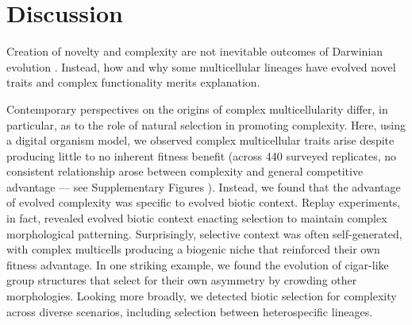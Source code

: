 \section{Discussion}
\label{sec:discussion}

Creation of novelty and complexity are not inevitable outcomes of Darwinian evolution \citep{stanley2017open}.
Instead, how and why some multicellular lineages have evolved novel traits and complex functionality merits explanation.

Contemporary perspectives on the origins of complex multicellularity differ, in particular, as to the role of natural selection in promoting complexity.
Here, using a digital organism model, we observed complex multicellular traits arise despite producing little to no inherent fitness benefit (across 440 surveyed replicates, no consistent relationship arose between complexity and general competitive advantage --- see Supplementary Figures ).
Instead, we found that the advantage of evolved complexity was specific to evolved biotic context.
Replay experiments, in fact, revealed evolved biotic context enacting selection to maintain complex morphological patterning.
Surprisingly, selective context was often self-generated, with complex multicells producing a biogenic niche that reinforced their own fitness advantage.
In one striking example, we found the evolution of cigar-like group structures that select for their own asymmetry by crowding other morphologies.
Looking more broadly, we detected biotic selection for complexity across diverse scenarios, including selection between heterospecific lineages.



